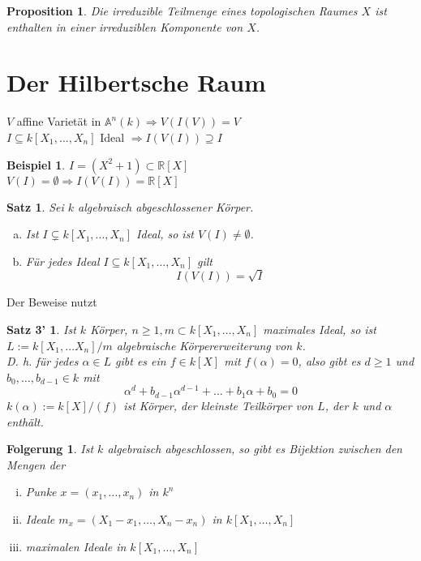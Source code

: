 \documentclass[a4paper,12pt]{report}
\theoremstyle{break}
\newtheorem{Satz}{Satz}
\newtheorem{Prop}[Def]{Proposition}
\newtheorem{Folg}[Def]{Folgerung}
\theoremstyle{nonumberbreak}
\newtheorem{nnBsp}{Beispiel}
\newtheorem{nnSatz3}{Satz 3'} %
\theoremstyle{nonumberplain}
\newcommand{\R}{\mathbb{R}}
\newcommand{\A}{\mathbb{A}}
\begin{document}
\begin{Prop}
Die irreduzible Teilmenge eines topologischen Raumes $X$ ist enthalten in einer irreduziblen Komponente von $X$.
\end{Prop}

\newpage


\section{Der Hilbertsche Raum}

$V$ affine Variet\"at in $ \A ^n(k) \Rightarrow V(I(V))=V$\\
$I\subseteq k[X_1,\dots ,X_n]$ Ideal $\Rightarrow I(V(I))\supseteq I$

\begin{nnBsp}
$I=(X^2+1)\subset\R[X]$\\
$V(I)=\emptyset \Rightarrow I(V(I)) = \R[X]$
\end{nnBsp}

\begin{Satz}\label{satz3}
Sei $k$ algebraisch abgeschlossener K\"orper.\begin{enumerate}[a)]
\item\label{satz3a}
	Ist $I\subsetneq k[X_1,\dots ,X_n]$ Ideal, so ist $V(I)\not=\emptyset$.
\item
	F\"ur jedes Ideal $I\subseteq k[X_1,\dots ,X_n]$ gilt
	\[I(V(I)) = \sqrt I\]
\end{enumerate}\end{Satz}

Der Beweise nutzt

\begin{nnSatz3}\label{hilfsatz3}
Ist $k$ K\"orper, $n\ge1, m\subset k[X_1,\dots ,X_n]$ maximales Ideal, so ist $L:=k[X_1,\dots X_n]/m$ algebraische K\"orpererweiterung von $k$.\\
D. h. f\"ur jedes $\alpha\in L$ gibt es ein $f\in k[X]$ mit $f(\alpha)=0$, also gibt es $d\ge1$ und $b_0,\dots ,b_{d-1}\in k$ mit
	\[\alpha^d+b_{d-1}\alpha^{d-1}+\dots +b_1\alpha + b_0=0\]
$k(\alpha):=k[X]/(f)$ ist K\"orper, der kleinste Teilk\"orper von $L$, der $k$ und $\alpha$ enth\"alt.
\end{nnSatz3}

\begin{Folg}\label{folg5.1}
Ist $k$ algebraisch abgeschlossen, so gibt es Bijektion zwischen den Mengen der\begin{enumerate}[i)]
\item
	Punke $x=(x_1,\dots ,x_n)$ in $k^n$
\item
	Ideale $m_x=(X_1-x_1,\dots ,X_n-x_n)$ in $k[X_1,\dots ,X_n]$
\item
	maximalen Ideale in $k[X_1,\dots ,X_n]$
\end{enumerate}\end{Folg}
\end{document}
